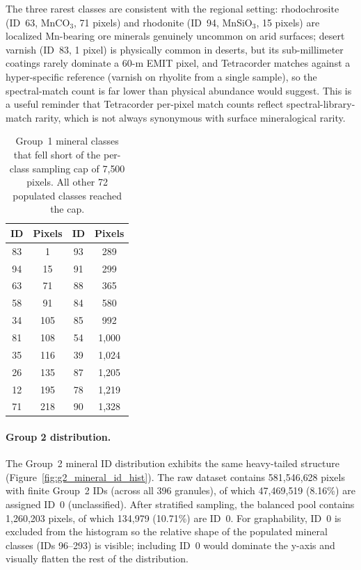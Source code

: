 \documentclass[11pt]{report}
\begin{document}
The three rarest classes are consistent with the regional setting: rhodochrosite (ID~63, MnCO$_3$, 71 pixels) and rhodonite (ID~94, MnSiO$_3$, 15 pixels) are localized Mn-bearing ore minerals genuinely uncommon on arid surfaces; desert varnish (ID~83, 1 pixel) is physically common in deserts, but its sub-millimeter coatings rarely dominate a 60-m EMIT pixel, and Tetracorder matches against a hyper-specific reference (varnish on rhyolite from a single sample), so the spectral-match count is far lower than physical abundance would suggest. This is a useful reminder that Tetracorder per-pixel match counts reflect spectral-library-match rarity, which is not always synonymous with surface mineralogical rarity.

\begin{table}[htbp]
\centering
\caption{Group~1 mineral classes that fell short of the per-class sampling cap of 7{,}500 pixels. All other 72 populated classes reached the cap.}
\label{tab:g1_shortfall}
\begin{tabular}{cccc}
\hline
\textbf{ID} & \textbf{Pixels} & \textbf{ID} & \textbf{Pixels} \\
\hline
83 & 1     & 93 & 289 \\
94 & 15    & 91 & 299 \\
63 & 71    & 88 & 365 \\
58 & 91    & 84 & 580 \\
34 & 105   & 85 & 992 \\
81 & 108   & 54 & 1{,}000 \\
35 & 116   & 39 & 1{,}024 \\
26 & 135   & 87 & 1{,}205 \\
12 & 195   & 78 & 1{,}219 \\
71 & 218   & 90 & 1{,}328 \\
\hline
\end{tabular}
\end{table}

\paragraph{Group 2 distribution.}
The Group~2 mineral ID distribution exhibits the same heavy-tailed structure (Figure~\ref{fig:g2_mineral_id_hist}). The raw dataset contains 581{,}546{,}628 pixels with finite Group~2 IDs (across all 396 granules), of which 47{,}469{,}519 (8.16\%) are assigned ID~0 (unclassified). After stratified sampling, the balanced pool contains 1{,}260{,}203 pixels, of which 134{,}979 (10.71\%) are ID~0. For graphability, ID~0 is excluded from the histogram so the relative shape of the populated mineral classes (IDs 96--293) is visible; including ID~0 would dominate the y-axis and visually flatten the rest of the distribution.
\end{document}
